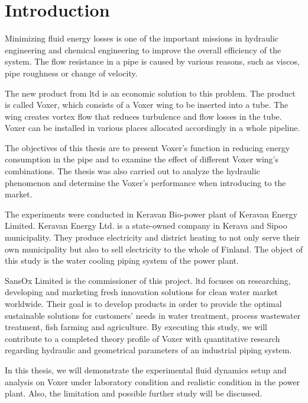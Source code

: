 
\chapter{Introduction}

Minimizing fluid energy losses is one of the important missions in hydraulic engineering and chemical engineering to improve the overall efficiency of the system. The flow resistance in a pipe is caused by various reasons, such as \gls{viscos}, pipe roughness or change of velocity.

The new product from \gls{ltd} is an economic solution to this problem. The product is called Voxer, which consists of a Voxer wing to be inserted into a tube. The wing creates vortex flow that reduces turbulence and flow losses in the tube. Voxer can be installed in various places allocated accordingly in a whole pipeline.

The objectives of this thesis are to present Voxer’s function in reducing energy consumption in the pipe and to examine the effect of different Voxer wing’s combinations. The thesis was also carried out to analyze the hydraulic phenomenon and determine the Voxer’s performance when introducing to the market.

The experiments were conducted in Keravan Bio-power plant of Keravan Energy Limited. Keravan Energy Ltd. is a state-owned company in Kerava and Sipoo municipality. They produce electricity and district heating to not only serve their own municipality but also to sell electricity to the whole of Finland. The object of this study is the water cooling piping system of the power plant.

SansOx Limited is the commissioner of this project. \gls{ltd} focuses on researching, developing and marketing fresh innovation solutions for clean water market worldwide. Their goal is to develop products in order to provide the optimal sustainable solutions for customers’ needs in water treatment, process wastewater treatment, fish farming and agriculture. By executing this study, we will contribute to a completed theory profile of Voxer with quantitative research regarding hydraulic and geometrical parameters of an industrial piping system.

In this thesis, we will demonstrate the experimental fluid dynamics setup and analysis on Voxer under laboratory condition and realistic condition in the power plant. Also, the limitation and possible further study will be discussed.
\clearpage %
